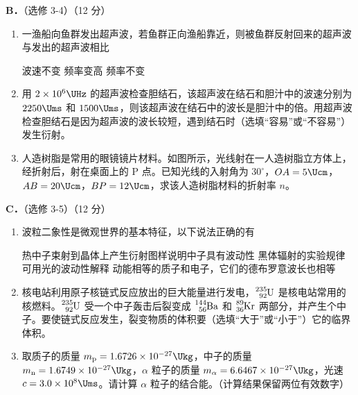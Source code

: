 \documentclass[\gkver]{gaokaozhenti}
\begin{document}
\begin{enumerate}
\begin{enumerate}
\end{enumerate}

\textbf{B．}（选修 3-4）（12 分）

\begin{enumerate}
	\item
	一渔船向鱼群发出超声波，若鱼群正向渔船靠近，则被鱼群反射回来的超声波与发出的超声波相比

	{波速不变}
	{频率变高}
	{频率不变}

	\item
	用 $2\times10^{6}\UHz$ 的超声波检查胆结石，该超声波在结石和胆汁中的波速分别为 $2250\Ums$ 和 $1500\Ums$，则该超声波在结石中的波长是胆汁中的倍。用超声波检查胆结石是因为超声波的波长较短，遇到结石时（选填“容易”或“不容易”）发生衍射。

	\item
	人造树脂是常用的眼镜镜片材料。如图所示，光线射在一人造树脂立方体上，经折射后，射在桌面上的 P 点。已知光线的入射角为 $30^{\circ}$，$OA=5\Ucm$，$AB=20\Ucm$，$BP=12\Ucm$，求该人造树脂材料的折射率 $n$。


\end{enumerate}

\textbf{C．}（选修 3-5）（12 分）

\begin{enumerate}
	\item
	波粒二象性是微观世界的基本特征，以下说法正确的有

	{热中子束射到晶体上产生衍射图样说明中子具有波动性}
	{黑体辐射的实验规律可用光的波动性解释}
	{动能相等的质子和电子，它们的德布罗意波长也相等}

	\item
	核电站利用原子核链式反应放出的巨大能量进行发电，$\ce{^{235}_{92}U}$ 是核电站常用的核燃料。$\ce{^{235}_{92}U}$ 受一个中子轰击后裂变成 $\ce{^{144}_{56}Ba}$ 和 $\ce{^{89}_{36}Kr}$ 两部分，并产生个中子。要使链式反应发生，裂变物质的体积要（选填“大于”或“小于”）它的临界体积。

	\item
	取质子的质量 $m_{\mathrm{p}}=1.6726\times10^{-27}\Ukg$，中子的质量 $m_{\mathrm{n}}=1.6749\times10^{-27}\Ukg$，$\alpha$ 粒子的质量 $m_{\alpha}=6.6467\times10^{-27}\Ukg$，光速 $c=3.0\times10^{8}\Ums$。请计算 $\alpha$ 粒子的结合能。（计算结果保留两位有效数字）


\end{enumerate}
\end{enumerate}
\end{document}
